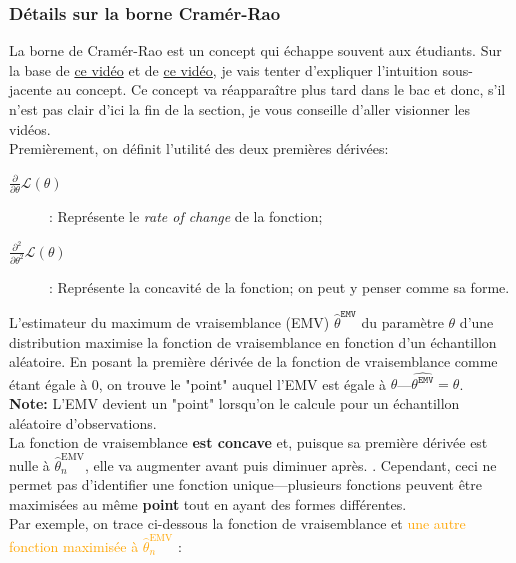 \documentclass[10pt, french]{article}
\begin{document}
\begin{multicols*}{2}
\subsubsection*{Détails sur la borne Cramér-Rao}
La borne de Cramér-Rao est un concept qui échappe souvent aux étudiants. Sur la base de \hyperlink{https://www.youtube.com/watch?v=igQIsYAlKlY}{\color{blue}ce vidéo} et de \hyperlink{https://www.youtube.com/watch?v=i0JiSddCXMM}{\color{blue}ce vidéo}, je vais tenter d'expliquer l'intuition sous-jacente au concept. Ce concept va réapparaître plus tard dans le bac et donc, s’il n’est pas clair d’ici la fin de la section, je vous conseille d’aller visionner les vidéos.	\\

Premièrement, on définit l'utilité des deux premières dérivées:
\begin{description}
	\item[$\frac{\partial}{\partial\theta} \mathcal{L}(\theta)$]: Représente le \og \textit{rate of change}\fg{} de la fonction;
	\item[$\frac{\partial^{2}}{\partial\theta^{2}} \mathcal{L}(\theta)$]: Représente la concavité de la fonction; on peut y penser comme sa forme.
\end{description}

L'estimateur du maximum de vraisemblance (EMV) $\hat\theta^{\texttt{EMV}}$ du paramètre $\theta$ d'une distribution maximise la fonction de vraisemblance en fonction d'un échantillon aléatoire. En posant la première dérivée de la fonction de vraisemblance comme étant égale à 0, on trouve le "point" auquel l'EMV est égale à $\theta$---$\hat{\theta^{\texttt{EMV}}}	=	\theta$. \\

\textbf{Note:}	L'EMV devient un "point" lorsqu'on le calcule pour un échantillon aléatoire d'observations.\\

La fonction de vraisemblance \textbf{est concave} et, puisque sa première dérivée est nulle à $\hat{\theta}^{\text{EMV}}_{n}$, elle va augmenter avant puis diminuer après. . Cependant, ceci ne permet pas d'identifier une fonction unique---plusieurs fonctions peuvent être maximisées au même \textbf{point} tout en ayant des formes différentes.	\\

Par exemple, on trace ci-dessous \textcolor{amethyst}{la fonction de vraisemblance} et \textcolor{orange}{une autre fonction maximisée à $\hat{\theta}^{\text{EMV}}_{n}$} :


\end{multicols*}
\end{document}
